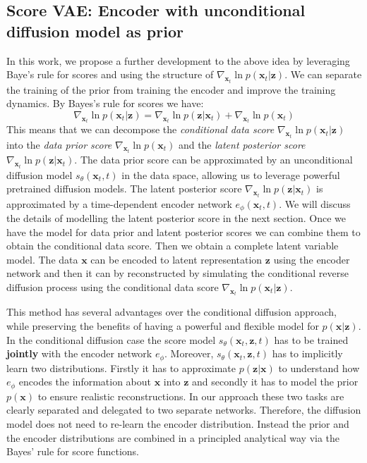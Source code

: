 \subsection{Score VAE: Encoder with unconditional diffusion model as prior}
In this work, we propose a further development to the above idea by leveraging Baye's rule for scores and using the structure of $\nabla_{\textbf{x}_t}  \ln{p(\textbf{x}_t | \textbf{z})}$. We can separate the training of the prior from training the encoder and improve the training dynamics.
By  Bayes's rule for scores we have:
\begin{equation*}
    \nabla_{\textbf{x}_t}  \ln{p(\textbf{x}_t | \textbf{z})} =  \nabla_{\textbf{x}_t}  \ln{p(\textbf{z} | \textbf{x}_t )} + \nabla_{\textbf{x}_t}  \ln{p(\textbf{x}_t)} 
\end{equation*}
This means that we can decompose the \textit{conditional data score} $\nabla_{\textbf{x}_t}  \ln{p(\textbf{x}_t | \textbf{z})} $ into the \textit{data prior score} $\nabla_{\textbf{x}_t}  \ln{p(\textbf{x}_t)} $ and the \textit{latent posterior score} $\nabla_{\textbf{x}_t}  \ln{p(\textbf{z} | \textbf{x}_t )}$. The data prior score can be approximated by an unconditional diffusion model $s_\theta(\textbf{x}_t,t)$ in the data space, allowing us to leverage powerful pretrained diffusion models. The latent posterior score $ \nabla_{\textbf{x}_t}  \ln{p(\textbf{z} | \textbf{x}_t )}$ is approximated by a time-dependent encoder network $e_\phi(\textbf{x}_t, t)$. We will discuss the details of modelling the latent posterior score in the next section. Once we have the model for data prior and latent posterior scores we can combine them to obtain the conditional data score. Then we obtain a complete latent variable model. The data $\textbf{x}$ can be encoded to latent representation $\textbf{z}$ using the encoder network and then it can by reconstructed by simulating the conditional reverse diffusion process using the conditional data score $\nabla_{\textbf{x}_t}  \ln{p(\textbf{x}_t | \textbf{z})}$.

This method has several advantages over the conditional diffusion approach, while preserving the benefits of having a powerful and flexible model for $p(\textbf{x}| \textbf{z})$.  In the conditional diffusion case the score model $s_\theta(\textbf{x}_t, \textbf{z},t)$ has to be trained \textbf{jointly} with the encoder network $e_\phi$. Moreover,  $s_\theta(\textbf{x}_t, \textbf{z},t)$  has to implicitly learn two distributions. Firstly it has to approximate $p( \textbf{z}| \textbf{x})$ to understand how $e_\phi$ encodes the information about $\textbf{x}$ into $\textbf{z}$ and secondly it has to model the prior $p(\textbf{x})$ to ensure realistic reconstructions. In our approach these two tasks are clearly separated and delegated to two separate networks. Therefore, the diffusion model does not need to re-learn the encoder distribution. Instead the prior and the encoder distributions are combined in a principled analytical way via the Bayes' rule for score functions. 

